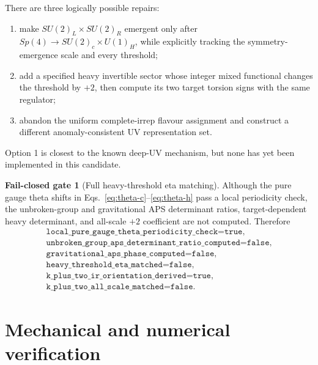 \documentclass[11pt]{article}
\theoremstyle{definition}
\newtheorem{gate}[theorem]{Fail-closed gate}
\theoremstyle{remark}
\begin{document}
There are three logically possible repairs:
\begin{enumerate}
\item make \(SU(2)_L\times SU(2)_R\) emergent only after
  \(Sp(4)\to SU(2)_c\times U(1)_H\), while explicitly tracking the
  symmetry-emergence scale and every threshold;
\item add a specified heavy invertible sector whose integer mixed
  functional changes the threshold by \(+2\), then compute its two target
  torsion signs with the same regulator;
\item abandon the uniform complete-irrep flavour assignment and construct
  a different anomaly-consistent UV representation set.
\end{enumerate}
Option 1 is closest to the known deep-UV mechanism, but none has yet been
implemented in this candidate.

\begin{gate}[Full heavy-threshold eta matching]
Although the pure gauge theta shifts in
Eqs.~\eqref{eq:theta-c}--\eqref{eq:theta-h} pass a local periodicity check,
the unbroken-group and gravitational APS determinant ratios, target-dependent
heavy determinant, and all-scale \(+2\) coefficient are not computed.
Therefore
\begin{equation}
 \begin{gathered}
 \texttt{local\_pure\_gauge\_theta\_periodicity\_check=true},\\
 \texttt{unbroken\_group\_aps\_determinant\_ratio\_computed=false},\\
 \texttt{gravitational\_aps\_phase\_computed=false},\\
 \texttt{heavy\_threshold\_eta\_matched=false},\\
 \texttt{k\_plus\_two\_ir\_orientation\_derived=true},\\
 \texttt{k\_plus\_two\_all\_scale\_matched=false}.
 \end{gathered}
 \label{eq:threshold-gates}
\end{equation}
\end{gate}

\section{Mechanical and numerical verification}
\end{document}
